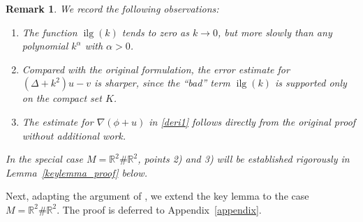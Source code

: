 \documentclass[12pt]{amsart}
\newtheorem{remark}[theorem]{Remark}
\begin{document}



\begin{remark}
We record the following observations:  
\begin{enumerate}[label=\arabic*)]
\item The function $\operatorname{ilg}(k)$ tends to zero as $k \to 0$, but more slowly than any polynomial $k^{\alpha}$ with $\alpha > 0$.  
\item Compared with the original formulation, the error estimate for $(\Delta + k^2)u - v$ is sharper, since the ``bad'' term $\operatorname{ilg}(k)$ is supported only on the compact set $K$.  
\item The estimate for $\nabla(\phi + u)$ in \eqref{deri1} follows directly from the original proof without additional work.  
\end{enumerate}
In the special case $M = \mathbb{R}^2 \# \mathbb{R}^2$, points 2) and 3) will be established rigorously in Lemma~\ref{keylemma_proof} below.
\end{remark}

Next, adapting the argument of \cite[Lemma~2.14]{HNS}, we extend the key lemma to the case $M=\mathbb{R}^2 \# \mathbb{R}^2$. The proof is deferred to Appendix~\ref{appendix}.
\end{document}
